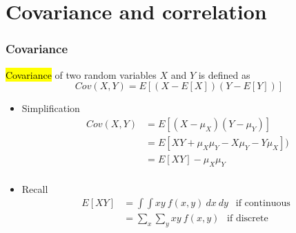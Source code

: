 \documentclass[slidestop,compress,mathserif]{beamer}
\begin{document}



\section{Covariance and correlation}

\begin{frame}\frametitle{Covariance}
\begin{defn}
\hl{Covariance} of two random variables $X$ and $Y$ is defined as
\[ Cov(X,Y) = E[ (X-E[X]) (Y-E[Y]) ] \]
\end{defn}
\pause
\begin{itemize}
\item Simplification
\begin{align*}
    Cov(X,Y)  &= E[ (X-\mu_X) (Y-\mu_Y) ]\\
             &= E[ XY+\mu_X\mu_Y-X\mu_Y-Y\mu_X]) \\
             &= E[XY]-\mu_X\mu_Y \\
\end{align*}
\pause \vspace{-0.7cm}
\item Recall
\begin{align*}
    E[XY]  &= \int\int xy ~f(x, y) ~dx~dy ~~ \text{ if continuous }\\
             &= \sum_x \sum_y xy~ f(x, y)~~ \text{ if discrete }
\end{align*}
\end{itemize}

\end{frame}

\end{document}

